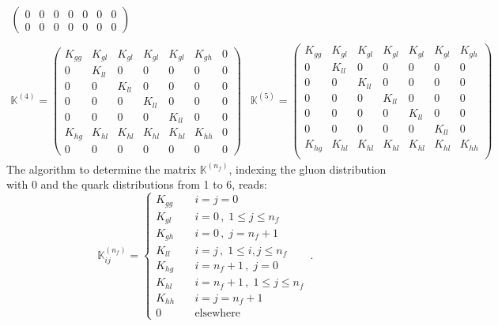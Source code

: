 \documentclass[10pt,a4paper]{article}
\begin{document}
\begin{equation}
\begin{array}{ll}
\begin{pmatrix}
0 & 0 & 0  & 0  & 0  & 0  & 0 \\
0 & 0 & 0  & 0  & 0  & 0  & 0
\end{pmatrix}
\\ \\
\mathbb{K}^{(4)} = 
\begin{pmatrix}
K_{gg} & K_{gl} & K_{gl} & K_{gl} & K_{gl} & K_{gh} & 0  \\
0 & K_{ll} & 0 & 0  & 0  & 0  & 0  \\
0 & 0 & K_{ll} & 0  & 0  & 0  & 0  \\
0 & 0 & 0 & K_{ll} & 0  & 0  & 0  \\
0 & 0 & 0 & 0 & K_{ll}  & 0  & 0  \\
K_{hg} & K_{hl} & K_{hl} & K_{hl} & K_{hl} & K_{hh}  & 0 \\
0 & 0 & 0  & 0  & 0  & 0  & 0
\end{pmatrix}
&
\mathbb{K}^{(5)} = 
\begin{pmatrix}
K_{gg} & K_{gl} & K_{gl} & K_{gl} & K_{gl} & K_{gl} & K_{gh} \\
0 & K_{ll} & 0 & 0 & 0  & 0  & 0  \\
0 & 0 & K_{ll} & 0 & 0  & 0  & 0  \\
0 & 0 & 0 & K_{ll} & 0  & 0  & 0  \\
0 & 0 & 0 & 0 & K_{ll} & 0  & 0  \\
0 & 0 & 0 & 0 & 0 & K_{ll} & 0  \\
K_{hg} & K_{hl} & K_{hl} & K_{hl} & K_{hl} & K_{hl} & K_{hh} \\
\end{pmatrix}
\end{array}
\label{eq:MathcingMatrices}
\end{equation}
The algorithm to determine the matrix $\mathbb{K}^{(n_f)}$, indexing
the gluon distribution with 0 and the quark distributions from 1 to 6,
reads:
\begin{equation}
\mathbb{K}_{ij}^{(n_f)} =
\left\{
\begin{array}{ll}
K_{gg} & \quad i = j = 0\\
K_{gl} & \quad i = 0\,,\;1\leq j \leq n_f\\
K_{gh} & \quad i = 0\,,\;j = n_f+1\\
K_{ll} & \quad i = j\,,\;1\leq i,j \leq n_f\\
K_{hg} & \quad i = n_f+1\,,\;j = 0\\
K_{hl} & \quad i = n_f+1\,,\;1\leq j \leq n_f\\
K_{hh} & \quad i = j = n_f+1\\
0 & \quad\mbox{elsewhere}
\end{array}
\right.\,.
\label{eq:algorithm}
\end{equation}
\end{document}
